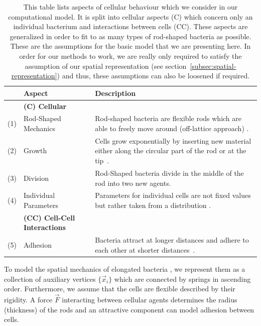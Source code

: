\documentclass{article}
\begin{document}
\begin{table}[H]
    \centering
    \def\arraystretch{1.3}
    \begin{tabularx}{\textwidth}{c l X}
        &\textbf{Aspect} & \textbf{Description}\\
        \toprule
        &\textbf{(C) Cellular}\\
        \midrule
        (1) & Rod-Shaped Mechanics &
            Rod-shaped bacteria are flexible rods which are able to freely move around (off-lattice
            approach) \cite{Takeuchi2005,Ursell2014,Amir2014_2}.\\
        (2) & Growth &
            Cells grow exponentially by inserting new material either along the circular part of the
            rod or at the tip~\cite{Robert2014,Takeuchi2005}.\\
        (3) & Division &
            Rod-Shaped bacteria divide in the middle of the rod into two new agents.\\
        (4) & Individual Parameters &
            Parameters for individual cells are not fixed values but rather taken from a
            distribution \cite{Koutsoumanis2013}.\\
        &\textbf{(CC) Cell-Cell Interactions}\\
        \midrule
        (5) & Adhesion &
            Bacteria attract at longer distances and adhere to each other at shorter
            distances~\cite{Verwey1947,Trejo2013}.\\
        \bottomrule
    \end{tabularx}
    \label{table:simulation-aspects}
    \caption{
        This table lists aspects of cellular behaviour which we consider in our computational model.
        It is split into cellular aspects (C) which concern only an individual bacterium and
        interactions between cells (CC).
        These aspects are generalized in order to fit to as many types of rod-shaped bacteria as
        possible.
        These are the assumptions for the basic model that we are presenting here.
        In order for our methods to work, we are really only required to satisfy the assumption of
        our spatial representation (see section~\ref{subsec:spatial-representation}) and thus, these
        assumptions can also be loosened if required.
    }
\end{table}

To model the spatial mechanics of elongated bacteria \cite{Billaudeau2017}, we represent them as a
collection of auxiliary vertices $\{\vec{x}_i\}$ which are connected by springs in
ascending order.
Furthermore, we assume that the cells are flexible described by their rigidity.
A force $\vec{F}$ interacting between cellular agents determines the radius (thickness) of the
rods and an attractive component can model adhesion between cells.
\end{document}

